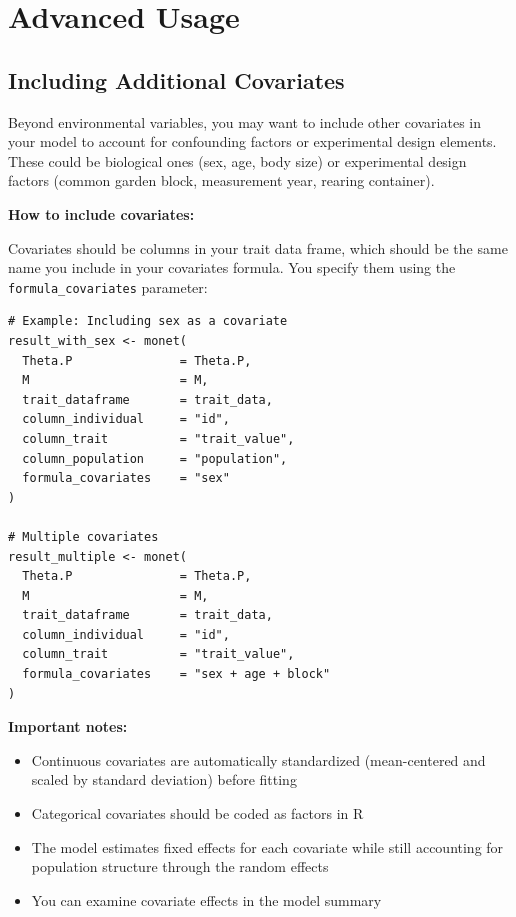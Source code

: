 \documentclass[11pt]{article}
\begin{document}
\section{Advanced Usage}

\subsection{Including Additional Covariates}

Beyond environmental variables, you may want to include other covariates in your model to account for confounding factors or experimental design elements. These could be biological ones (sex, age, body size) or experimental design factors (common garden block, measurement year, rearing container).

\textbf{How to include covariates:}

Covariates should be columns in your trait data frame, which should be the same name you include in your covariates formula. You specify them using the \texttt{formula\_covariates} parameter:

\begin{lstlisting}
# Example: Including sex as a covariate
result_with_sex <- monet(
  Theta.P               = Theta.P,
  M                     = M,
  trait_dataframe       = trait_data,
  column_individual     = "id",
  column_trait          = "trait_value",
  column_population     = "population",
  formula_covariates    = "sex"
)

# Multiple covariates
result_multiple <- monet(
  Theta.P               = Theta.P,
  M                     = M,
  trait_dataframe       = trait_data,
  column_individual     = "id",
  column_trait          = "trait_value",
  formula_covariates    = "sex + age + block"
)
\end{lstlisting}

\textbf{Important notes:}
\begin{itemize}
\item Continuous covariates are automatically standardized (mean-centered and scaled by standard deviation) before fitting
\item Categorical covariates should be coded as factors in R
\item The model estimates fixed effects for each covariate while still accounting for population structure through the random effects
\item You can examine covariate effects in the model summary
\end{itemize}
\end{document}
